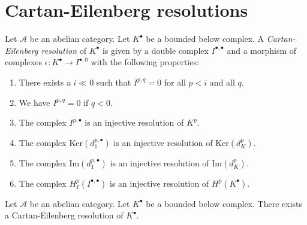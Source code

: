 \section{Cartan-Eilenberg resolutions}
\label{section-cartan-eilenberg}

\begin{definition}
\label{definition-cartan-eilenberg}
Let $\mathcal{A}$ be an abelian category.
Let $K^\bullet$ be a bounded below complex.
A {\it Cartan-Eilenberg resolution} of $K^\bullet$
is given by a double complex $I^{\bullet, \bullet}$
and a morphism of complexes $\epsilon : K^\bullet \to I^{\bullet, 0}$
with the following properties:
\begin{enumerate}
\item There exists a $i \ll 0$ such that $I^{p, q} = 0$ for all $p < i$
and all $q$.
\item We have $I^{p, q} = 0$ if $q < 0$.
\item The complex $I^{p, \bullet}$ is an injective resolution of $K^p$.
\item The complex $\text{Ker}(d_1^{p, \bullet})$ is an injective resolution
of $\text{Ker}(d_K^p)$.
\item The complex $\text{Im}(d_1^{p, \bullet})$ is an injective resolution
of $\text{Im}(d_K^p)$.
\item The complex $H^p_{I}(I^{\bullet, \bullet})$ is an injective resolution
of $H^p(K^\bullet)$.
\end{enumerate}
\end{definition}

\begin{lemma}
\label{lemma-cartan-eilenberg}
Let $\mathcal{A}$ be an abelian category.
Let $K^\bullet$ be a bounded below complex.
There exists a Cartan-Eilenberg resolution of $K^\bullet$.
\end{lemma}


